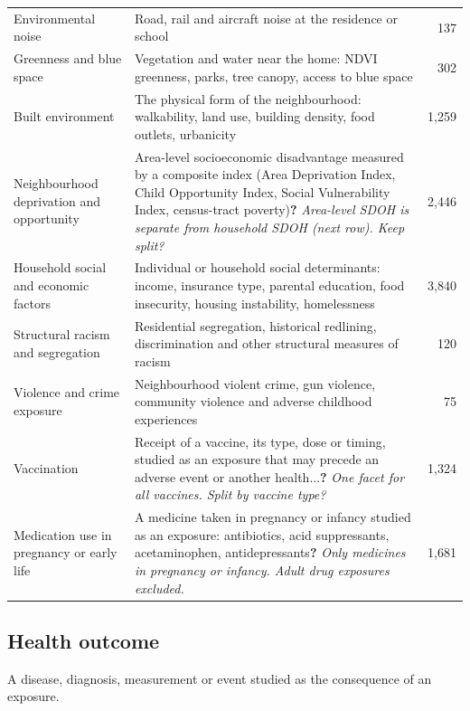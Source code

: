 \documentclass[10pt]{article}
\begin{document}
\begin{longtable}{@{}P{3.6cm}P{9.4cm}r@{}}
Environmental noise & Road, rail and aircraft noise at the residence or school & 137\\
Greenness and blue space & Vegetation and water near the home: NDVI greenness, parks, tree canopy, access to blue space & 302\\
Built environment & The physical form of the neighbourhood: walkability, land use, building density, food outlets, urbanicity & 1,259\\
Neighbourhood deprivation and opportunity & Area-level socioeconomic disadvantage measured by a composite index (Area Deprivation Index, Child Opportunity Index, Social Vulnerability Index, census-tract poverty)\newline\textbf{?} \emph{Area-level SDOH is separate from household SDOH (next row). Keep split?} & 2,446\\
Household social and economic factors & Individual or household social determinants: income, insurance type, parental education, food insecurity, housing instability, homelessness & 3,840\\
Structural racism and segregation & Residential segregation, historical redlining, discrimination and other structural measures of racism & 120\\
Violence and crime exposure & Neighbourhood violent crime, gun violence, community violence and adverse childhood experiences & 75\\
Vaccination & Receipt of a vaccine, its type, dose or timing, studied as an exposure that may precede an adverse event or another health...\newline\textbf{?} \emph{One facet for all vaccines. Split by vaccine type?} & 1,324\\
Medication use in pregnancy or early life & A medicine taken in pregnancy or infancy studied as an exposure: antibiotics, acid suppressants, acetaminophen, antidepressants\newline\textbf{?} \emph{Only medicines in pregnancy or infancy. Adult drug exposures excluded.} & 1,681\\
\bottomrule\end{longtable}
\subsection{Health outcome}
A disease, diagnosis, measurement or event studied as the consequence of an exposure.
\end{document}
